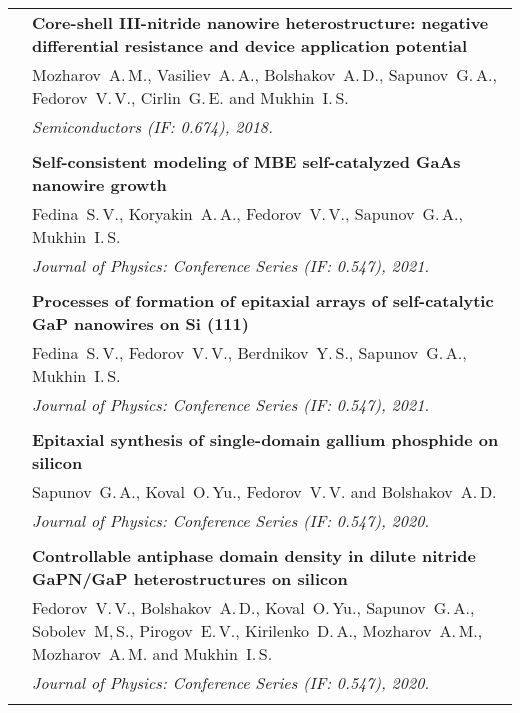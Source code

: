\documentclass[letterpaper, 11pt]{article}
\begin{document}
\begin{longtable}{p{1.3in}p{4.8in}}
		& \textbf{Core-shell III-nitride nanowire heterostructure: negative differential resistance and device application potential} \\
		& Mozharov~A.\,M., Vasiliev~A.\,A., Bolshakov~A.\,D., Sapunov~G.\,A., Fedorov~V.\,V., Cirlin~G.\,E. and Mukhin~I.\,S. \\
        & \textit{Semiconductors (IF: 0.674), 2018.}\\
		& \\

		\nohyphens{\color{OliveGreen}{Q4 Publications}}
        & \textbf{Self-consistent modeling of MBE self-catalyzed GaAs nanowire
        growth} \\
        & Fedina~S.\,V., Koryakin~A.\,A., Fedorov~V.\,V., Sapunov~G.\,A.,
        Mukhin~I.\,S. \\
        & \textit{Journal of Physics: Conference Series (IF: 0.547), 2021.}\\
		& \\

        & \textbf{Processes of formation of epitaxial arrays of self-catalytic
        GaP nanowires on Si (111)} \\
        & Fedina~S.\,V., Fedorov~V.\,V., Berdnikov~Y.\,S., Sapunov~G.\,A.,
        Mukhin~I.\,S. \\
        & \textit{Journal of Physics: Conference Series (IF: 0.547), 2021.}\\
		& \\
		
        & \textbf{Epitaxial synthesis of single-domain gallium phosphide on
        silicon} \\
        & Sapunov~G.\,A., Koval~O.\,Yu., Fedorov~V.\,V. and Bolshakov~A.\,D. \\
        & \textit{Journal of Physics: Conference Series (IF: 0.547), 2020.}\\
		& \\
		
        & \textbf{Controllable antiphase domain density in dilute nitride
        GaPN/GaP heterostructures on silicon} \\
        & Fedorov~V.\,V., Bolshakov~A.\,D., Koval~O.\,Yu., Sapunov~G.\,A.,
        Sobolev~M,\,S., Pirogov~E.\,V., Kirilenko~D.\,A., Mozharov~A.\,M.,
        Mozharov~A.\,M. and Mukhin~I.\,S. \\
        & \textit{Journal of Physics: Conference Series (IF: 0.547), 2020.}\\
		& \\
		

\end{longtable}
\end{document}
